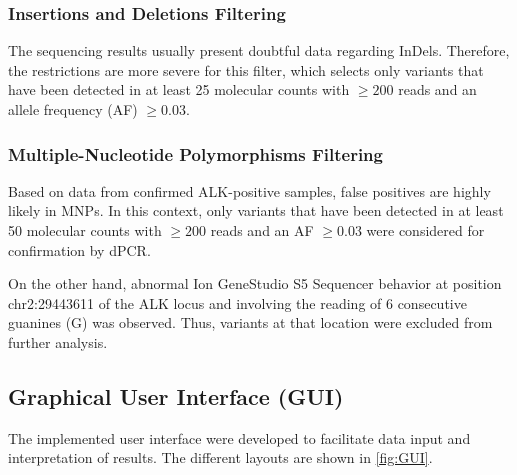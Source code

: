 \subsubsection{Insertions and Deletions Filtering}

The sequencing results usually present doubtful data regarding InDels. Therefore, the restrictions are more severe for this filter, which selects only variants that have been detected in at least 25 molecular counts with $\ge 200$ reads and an allele frequency (AF) $\ge 0.03$.

\subsubsection{Multiple-Nucleotide Polymorphisms Filtering}

Based on data from confirmed ALK-positive samples, false positives are highly likely in MNPs. In this context, only variants that have been detected in at least 50 molecular counts with $\ge 200$ reads and an AF $\ge 0.03$ were considered for confirmation by dPCR. 

On the other hand, abnormal Ion GeneStudio\texttrademark{} S5 Sequencer behavior at position chr2:29443611 of the ALK locus and involving the reading of 6 consecutive guanines (G) was observed. Thus, variants at that location were excluded from further analysis.

\subsection{Graphical User Interface (GUI)}

The implemented user interface were developed to facilitate data input and interpretation of results. The different layouts are shown in \autoref{fig:GUI}.


